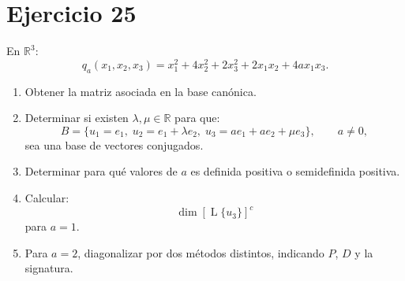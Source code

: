 \documentclass[11pt,a4paper]{article}
\newcommand{\R}{\mathbb{R}}
\newcommand{\Span}{\operatorname{L}}
\begin{document}
\section{Ejercicio 25}
En $\R^3$:
\[
q_a(x_1,x_2,x_3)
=
x_1^2+4x_2^2+2x_3^2+2x_1x_2+4ax_1x_3.
\]
\begin{enumerate}[label=\alph*)]
\item Obtener la matriz asociada en la base canónica.
\item Determinar si existen $\lambda,\mu\in\R$ para que:
\[
B=
\{u_1=e_1,\;
u_2=e_1+\lambda e_2,\;
u_3=ae_1+ae_2+\mu e_3\},
\qquad a\neq0,
\]
sea una base de vectores conjugados.
\item Determinar para qué valores de $a$ es definida positiva o semidefinida positiva.
\item Calcular:
\[
\dim\left[\Span\{u_3\}\right]^c
\]
para $a=1$.
\item Para $a=2$, diagonalizar por dos métodos distintos, indicando $P$, $D$ y la signatura.
\end{enumerate}
\end{document}
